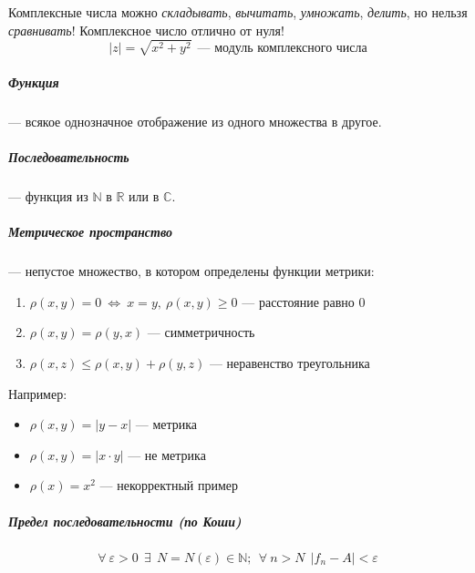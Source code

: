 \documentclass[12pt, a4]{article}
\begin{document}
Комплексные числа можно \textit{складывать}, \textit{вычитать}, \textit{умножать}, \textit{делить}, но нельзя \textit{сравнивать}! Комплексное число отлично от нуля!
\[ |z| = \sqrt{x^2+y^2} \ \ \textrm{--- модуль комплексного числа} \]

\subparagraph{Функция} --- всякое однозначное отображение из одного множества в другое.

\subparagraph{Последовательность} --- функция из $\mathbb{N}$ в $\mathbb{R}$ или в $\mathbb{C}$.

\subparagraph{Метрическое пространство} --- непустое множество, в котором определены функции метрики:
\begin{enumerate}[leftmargin=2cm]
	\item $\rho(x, y) = 0 \ \Leftrightarrow \ x=y, \ \rho(x, y) \geq 0$ --- расстояние равно 0
	\item $\rho(x, y) = \rho(y, x)$ --- симметричность
	\item $\rho(x, z) \leq \rho(x, y) + \rho(y, z)$ --- неравенство треугольника
\end{enumerate}

Например:
\begin{itemize}[leftmargin=2cm]
	\item $\rho(x, y) = |y - x|$ --- метрика
	\item $\rho(x, y) = |x\cdot y|$ --- не метрика
	\item $\rho(x) = x^2$ --- некорректный пример
\end{itemize}

\subparagraph{Предел последовательности (по Коши)}

\[\forall \ \varepsilon>0 \ \ \exists \ \ N=N(\varepsilon) \in \mathbb{N}; \ \ \forall \ n>N \ \ |f_n-A|<\varepsilon \]
\end{document}
